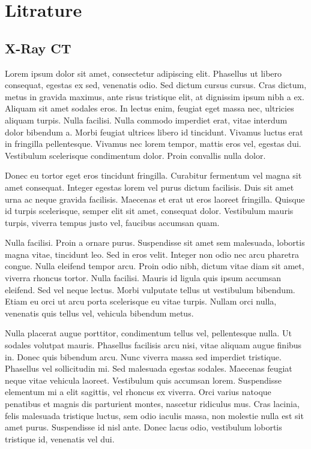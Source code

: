 \chapter{Litrature}

\section{X-Ray CT}

\cite{Radon1986}
\cite{barrett2004artifacts}
\cite{hunter2014characterization}
\cite{hornak2008basics}
\cite{alessio2006pet}
\cite{gordon1974tutorial}
\cite{andersen1984simultaneous}
\cite{van1987numerical}
\cite{buzug2008computed}
\cite{hounsfield1973computerized}
\cite{Lippman2000}


Lorem ipsum dolor sit amet, consectetur adipiscing elit. Phasellus ut libero consequat, egestas ex sed, venenatis odio. Sed dictum cursus cursus. Cras dictum, metus in gravida maximus, ante risus tristique elit, at dignissim ipsum nibh a ex. Aliquam sit amet sodales eros. In lectus enim, feugiat eget massa nec, ultricies aliquam turpis. Nulla facilisi. Nulla commodo imperdiet erat, vitae interdum dolor bibendum a. Morbi feugiat ultrices libero id tincidunt. Vivamus luctus erat in fringilla pellentesque. Vivamus nec lorem tempor, mattis eros vel, egestas dui. Vestibulum scelerisque condimentum dolor. Proin convallis nulla dolor.

Donec eu tortor eget eros tincidunt fringilla. Curabitur fermentum vel magna sit amet consequat. Integer egestas lorem vel purus dictum facilisis. Duis sit amet urna ac neque gravida facilisis. Maecenas et erat ut eros laoreet fringilla. Quisque id turpis scelerisque, semper elit sit amet, consequat dolor. Vestibulum mauris turpis, viverra tempus justo vel, faucibus accumsan quam.

Nulla facilisi. Proin a ornare purus. Suspendisse sit amet sem malesuada, lobortis magna vitae, tincidunt leo. Sed in eros velit. Integer non odio nec arcu pharetra congue. Nulla eleifend tempor arcu. Proin odio nibh, dictum vitae diam sit amet, viverra rhoncus tortor. Nulla facilisi. Mauris id ligula quis ipsum accumsan eleifend. Sed vel neque lectus. Morbi vulputate tellus ut vestibulum bibendum. Etiam eu orci ut arcu porta scelerisque eu vitae turpis. Nullam orci nulla, venenatis quis tellus vel, vehicula bibendum metus.

Nulla placerat augue porttitor, condimentum tellus vel, pellentesque nulla. Ut sodales volutpat mauris. Phasellus facilisis arcu nisi, vitae aliquam augue finibus in. Donec quis bibendum arcu. Nunc viverra massa sed imperdiet tristique. Phasellus vel sollicitudin mi. Sed malesuada egestas sodales. Maecenas feugiat neque vitae vehicula laoreet. Vestibulum quis accumsan lorem. Suspendisse elementum mi a elit sagittis, vel rhoncus ex viverra. Orci varius natoque penatibus et magnis dis parturient montes, nascetur ridiculus mus. Cras lacinia, felis malesuada tristique luctus, sem odio iaculis massa, non molestie nulla est sit amet purus. Suspendisse id nisl ante. Donec lacus odio, vestibulum lobortis tristique id, venenatis vel dui.

